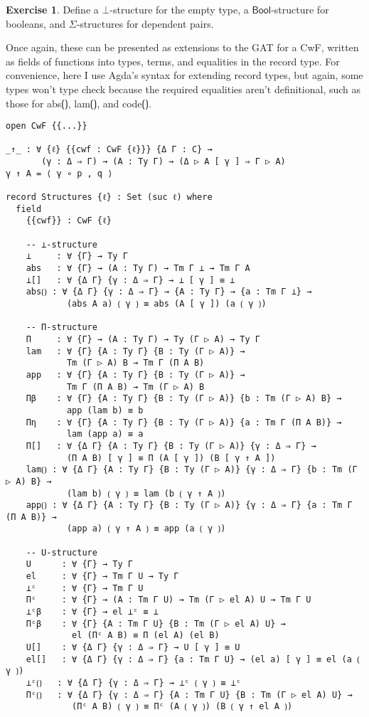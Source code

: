 \documentclass{article}
\renewcommand{\_}{\textrm{\textscale{.5}{\textunderscore}}}
\newcommand{\bool}{\mathsf{Bool}}
\theoremstyle{definition}
\newtheorem{exercise}[definition]{Exercise}
\theoremstyle{plain}
\begin{document}
\begin{exercise}
Define a $\bot$-structure for the empty type,
a $\bool$-structure for booleans, and
$\Sigma$-structures for dependent pairs.
\end{exercise}

Once again, these can be presented as extensions to the GAT for a CwF,
written as fields of functions into types, terms, and equalities in the record type.
For convenience, here I use Agda's syntax for extending record types,
but again, some types won't type check because the required equalities aren't definitional,
such as those for {\codefont abs⟮⟯}, {\codefont lam⟮⟯}, and {\codefont code⟮⟯}.

\begin{verbatim}
open CwF {{...}}

_↑_ : ∀ {ℓ} {{cwf : CwF {ℓ}}} {Δ Γ : C} →
       (γ : Δ ⇒ Γ) → (A : Ty Γ) → (Δ ▷ A [ γ ] ⇒ Γ ▷ A)
γ ↑ A = ⟨ γ ∘ p , q ⟩

record Structures {ℓ} : Set (suc ℓ) where
  field
    {{cwf}} : CwF {ℓ}

    -- ⊥-structure
    ⊥     : ∀ {Γ} → Ty Γ
    abs   : ∀ {Γ} → (A : Ty Γ) → Tm Γ ⊥ → Tm Γ A
    ⊥[]   : ∀ {Δ Γ} {γ : Δ ⇒ Γ} → ⊥ [ γ ] ≡ ⊥
    abs⟮⟯ : ∀ {Δ Γ} {γ : Δ ⇒ Γ} → {A : Ty Γ} → {a : Tm Γ ⊥} →
            (abs A a) ⟮ γ ⟯ ≡ abs (A [ γ ]) (a ⟮ γ ⟯)

    -- Π-structure
    Π     : ∀ {Γ} → (A : Ty Γ) → Ty (Γ ▷ A) → Ty Γ
    lam   : ∀ {Γ} {A : Ty Γ} {B : Ty (Γ ▷ A)} →
            Tm (Γ ▷ A) B → Tm Γ (Π A B)
    app   : ∀ {Γ} {A : Ty Γ} {B : Ty (Γ ▷ A)} →
            Tm Γ (Π A B) → Tm (Γ ▷ A) B
    Πβ    : ∀ {Γ} {A : Ty Γ} {B : Ty (Γ ▷ A)} {b : Tm (Γ ▷ A) B} →
            app (lam b) ≡ b
    Πη    : ∀ {Γ} {A : Ty Γ} {B : Ty (Γ ▷ A)} {a : Tm Γ (Π A B)} →
            lam (app a) ≡ a
    Π[]   : ∀ {Δ Γ} {A : Ty Γ} {B : Ty (Γ ▷ A)} {γ : Δ ⇒ Γ} →
            (Π A B) [ γ ] ≡ Π (A [ γ ]) (B [ γ ↑ A ])
    lam⟮⟯ : ∀ {Δ Γ} {A : Ty Γ} {B : Ty (Γ ▷ A)} {γ : Δ ⇒ Γ} {b : Tm (Γ ▷ A) B} →
            (lam b) ⟮ γ ⟯ ≡ lam (b ⟮ γ ↑ A ⟯)
    app⟮⟯ : ∀ {Δ Γ} {A : Ty Γ} {B : Ty (Γ ▷ A)} {γ : Δ ⇒ Γ} {a : Tm Γ (Π A B)} →
            (app a) ⟮ γ ↑ A ⟯ ≡ app (a ⟮ γ ⟯)

    -- U-structure
    U      : ∀ {Γ} → Ty Γ
    el     : ∀ {Γ} → Tm Γ U → Ty Γ
    ⊥ᶜ     : ∀ {Γ} → Tm Γ U
    Πᶜ     : ∀ {Γ} → (A : Tm Γ U) → Tm (Γ ▷ el A) U → Tm Γ U
    ⊥ᶜβ    : ∀ {Γ} → el ⊥ᶜ ≡ ⊥
    Πᶜβ    : ∀ {Γ} {A : Tm Γ U} {B : Tm (Γ ▷ el A) U} →
             el (Πᶜ A B) ≡ Π (el A) (el B)
    U[]    : ∀ {Δ Γ} {γ : Δ ⇒ Γ} → U [ γ ] ≡ U
    el[]   : ∀ {Δ Γ} {γ : Δ ⇒ Γ} {a : Tm Γ U} → (el a) [ γ ] ≡ el (a ⟮ γ ⟯)
    ⊥ᶜ⟮⟯   : ∀ {Δ Γ} {γ : Δ ⇒ Γ} → ⊥ᶜ ⟮ γ ⟯ ≡ ⊥ᶜ
    Πᶜ⟮⟯   : ∀ {Δ Γ} {γ : Δ ⇒ Γ} {A : Tm Γ U} {B : Tm (Γ ▷ el A) U} →
             (Πᶜ A B) ⟮ γ ⟯ ≡ Πᶜ (A ⟮ γ ⟯) (B ⟮ γ ↑ el A ⟯)
\end{verbatim}
\end{document}
